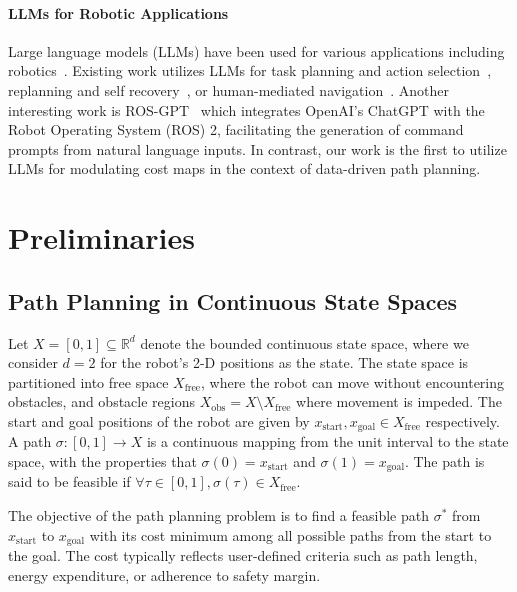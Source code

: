 \paragraph{LLMs for Robotic Applications}
Large language models (LLMs) have been used for various applications including robotics~\cite{zeng2023large}. Existing work utilizes LLMs for task planning and action selection~\cite{ahn2022can,joublin2024copal,hu2024deploying,liu2023llmp}, replanning and self recovery~\cite{shirasaka2023selfrecovery,skreta2024replan}, or human-mediated navigation~\cite{xiao2023llm,dai2024think}. Another interesting work is ROS-GPT~\cite{koubaa2023rosgpt} which integrates OpenAI's ChatGPT with the Robot Operating System (ROS) 2, facilitating the generation of command prompts from natural language inputs. In contrast, our work is the first to utilize LLMs for modulating cost maps in the context of data-driven path planning.

\section{Preliminaries}
\subsection{Path Planning in Continuous State Spaces}
\label{subsec:path planning}
Let $X=[0, 1] \subseteq \mathbb{R}^d$ denote the bounded continuous state space, where we consider $d=2$ for the robot's 2-D positions as the state. The state space is partitioned into free space $X_{\text{free}}$, where the robot can move without encountering obstacles, and obstacle regions $X_{\text{obs}}= X\setminus X_{\text{free}}$ where movement is impeded. The start and goal positions of the robot are given by $x_{\text{start}}, x_{\text{goal}} \in X_{\text{free}}$ respectively. A path $\sigma: [0,1] \rightarrow X$ is a continuous mapping from the unit interval to the state space, with the properties that $\sigma(0) = x_{\text{start}}$ and $\sigma(1) = x_{\text{goal}}$. The path is said to be feasible if $\forall \tau \in [0,1], \sigma(\tau) \in X_{\text{free}}$.

The objective of the path planning problem is to find a feasible path $\sigma^*$ from $x_{\text{start}}$ to $x_{\text{goal}}$ with its cost minimum among all possible paths from the start to the goal. The cost typically reflects user-defined criteria such as path length, energy expenditure, or adherence to safety margin.

